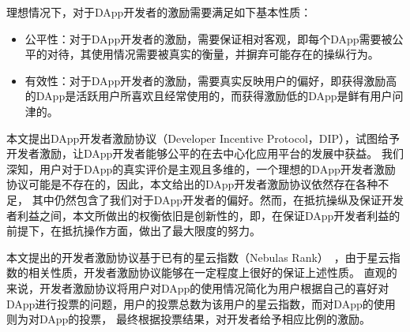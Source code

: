 理想情况下，对于DApp开发者的激励需要满足如下基本性质：
\begin{itemize}
\item 公平性：对于DApp开发者的激励，需要保证相对客观，即每个DApp需要被公平的对待，其使用情况需要被真实的衡量，并摒弃可能存在的操纵行为。
\item 有效性：对于DApp开发者的激励，需要真实反映用户的偏好，即获得激励高的DApp是活跃用户所喜欢且经常使用的，而获得激励低的DApp是鲜有用户问津的。
\begin{comment}
	\item 公开性：链上的DApp激励协议与传统的评奖方式最大的不同在于，所有评分的机制必须是完全公开的，
	且其中任何统计、计算、评选的过程都是全程可见的。
	这样就杜绝了传统中心化评奖暗箱操作的可能。同时也不会出现票数统计出错等情况。
	最后，根据评选结果分配奖励的过程也会保证被执行，奖励分配正如链上交易一样可被追溯。
	\item 有效性：这也是任何评选机制所要满足的基本性质。我们期望DApp评分能够真实反映用户的评价，
	即排名高的DApp是活跃用户所喜欢的且经常被调用的，而评分低的DApp是用户鲜有问津的。
	\item 抗作弊：对于任何排名算法，都需要解决各类作弊问题。对于DIP而言，主要存在两类作弊问题。
	\begin{enumerate}
		\item 女巫攻击：区块链技术的一个重大特点就是一个用户建立新的节点地址代价是很小的。所以一个用户有可能建立多个由他控制的地址，并将他们伪装成多个正常用户来参与评选。
		一个好的激励协议应当保证每个用户无法通过女巫攻击带来巨大额外收益。
		\item 收买：由于我们衡量DApp好坏的主要指标是活跃用户调用的次数，一个DApp开发者有可能收买大量用户让他们调用自己的DApp以提高自己的排名从而获得更多奖励。
		这种作弊方式原则上无法杜绝，但我们期望激励协议能够让此类收买需要付出的代价变得很高以减少其出现的概率。
	\end{enumerate}
\end{comment}
\end{itemize}


本文提出DApp开发者激励协议（Developer Incentive Protocol，DIP），试图给予开发者激励，让DApp开发者能够公平的在去中心化应用平台的发展中获益。
我们深知，用户对于DApp的真实评价是主观且多维的，一个理想的DApp开发者激励协议可能是不存在的，因此，本文给出的DApp开发者激励协议依然存在各种不足，
其中仍然包含了我们对于DApp开发者的偏好。然而，在抵抗操纵及保证开发者利益之间，本文所做出的权衡依旧是创新性的，即，在保证DApp开发者利益的前提下，在抵抗操作方面，做出了最大限度的努力。

本文提出的开发者激励协议基于已有的星云指数（Nebulas Rank）~\cite{Nabulasyellowpaper}，由于星云指数的相关性质，开发者激励协议能够在一定程度上很好的保证上述性质。
直观的来说，开发者激励协议将用户对DApp的使用情况简化为用户根据自己的喜好对DApp进行投票的问题，用户的投票总数为该用户的星云指数，而对DApp的使用则为对DApp的投票，
最终根据投票结果，对开发者给予相应比例的激励。

